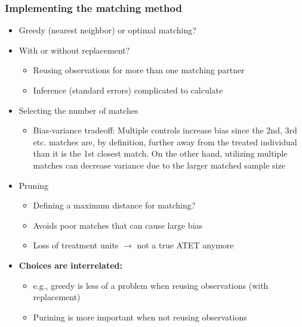 \documentclass[10pt]{article}
\begin{document}
\subsubsection{Implementing the matching method}
\begin{itemize}
    \item Greedy (nearest neighbor) or optimal matching?
    \item With or without replacement?
    \begin{itemize}
        \item Reusing observations for more than one matching partner 
        \item Inference (standard errors) complicated to calculate 
    \end{itemize}
    \item Selecting the number of matches 
    \begin{itemize}
        \item Bias-variance tradeoff: Multiple controls increase bias since the 2nd, 3rd etc. matches are, by definition, further away from the treated individual than it is the 1st closest match. On the other hand, utilizing multiple matches can decrease variance due to the larger matched sample size 
    \end{itemize}
    \item Pruning 
    \begin{itemize}
        \item Defining a maximum distance for matching?
        \item Avoids poor matches that can cause large bias 
        \item Loss of treatment units $\to $ not a true ATET anymore 
    \end{itemize}
    \item \textbf{Choices are interrelated:}
    \begin{itemize}
        \item e.g., greedy is less of a problem when reusing observations (with replacement)
        \item Purining is more important when not reusing observations 
    \end{itemize}
\end{itemize}
\end{document}
